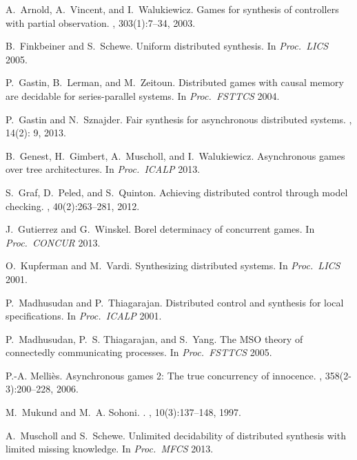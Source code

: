 \documentclass[10pt,a4paper]{article}
\begin{document}
\begin{thebibliography}{10}

A.~Arnold, A.~Vincent, and I.~Walukiewicz.
\newblock Games for synthesis of controllers with partial observation.
, 303(1):7--34, 2003.

B.~Finkbeiner and S.~Schewe.
\newblock Uniform distributed synthesis.
\newblock In {\em Proc.~LICS} 2005.

P.~Gastin, B.~Lerman, and M.~Zeitoun.
\newblock Distributed games with causal memory are decidable for
  series-parallel systems.
\newblock In {\em Proc.~FSTTCS} 2004.

P.~Gastin and N.~Sznajder.
\newblock Fair synthesis for asynchronous distributed systems.
, 14(2): 9, 2013.

B.~Genest, H.~Gimbert, A.~Muscholl, and I.~Walukiewicz.
\newblock Asynchronous games over tree architectures.
\newblock In {\em Proc.~ICALP} 2013.

S.~Graf, D.~Peled, and S.~Quinton.
\newblock Achieving distributed control through model checking.
, 40(2):263--281, 2012.

J.~Gutierrez and G.~Winskel.
\newblock Borel determinacy of concurrent games.
\newblock In {\em Proc.~CONCUR} 2013.

O.~Kupferman and M.~Vardi.
\newblock Synthesizing distributed systems.
\newblock In {\em Proc.~LICS} 2001.

P.~Madhusudan and P.~Thiagarajan.
\newblock Distributed control and synthesis for local specifications.
\newblock In {\em Proc.~ICALP} 2001.

P.~Madhusudan, P.~S. Thiagarajan, and S.~Yang.
\newblock The {MSO} theory of connectedly communicating processes.
\newblock In {\em Proc.~FSTTCS} 2005.

P.-A. Melli\`es.
\newblock Asynchronous games 2: {T}he true concurrency of innocence.
, 358(2-3):200--228, 2006.


M.~Mukund and M.~A. Sohoni.
.
, 10(3):137--148, 1997.

A.~Muscholl and S.~Schewe.
\newblock Unlimited decidability of distributed synthesis with limited missing
  knowledge.
\newblock In {\em Proc.~MFCS} 2013.


\end{thebibliography}
\end{document}
